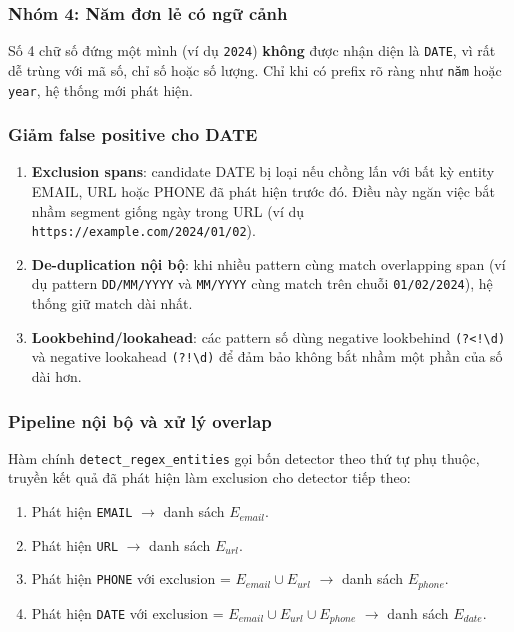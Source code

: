 \subsubsection*{Nhóm 4: Năm đơn lẻ có ngữ cảnh}

Số 4 chữ số đứng một mình (ví dụ \texttt{2024}) \textbf{không} được nhận diện
là \texttt{DATE}, vì rất dễ trùng với mã số, chỉ số hoặc số lượng. Chỉ khi có
prefix rõ ràng như \texttt{năm} hoặc \texttt{year}, hệ thống mới phát hiện.

\subsubsection*{Giảm false positive cho DATE}

\begin{enumerate}[nosep]
      \item \textbf{Exclusion spans}: candidate DATE bị loại nếu chồng lấn với
            bất kỳ entity EMAIL, URL hoặc PHONE đã phát hiện trước đó. Điều
            này ngăn việc bắt nhầm segment giống ngày trong URL
            (ví dụ \texttt{https://example.com/2024/01/02}).
      \item \textbf{De-duplication nội bộ}: khi nhiều pattern cùng match
            overlapping span (ví dụ pattern \texttt{DD/MM/YYYY} và
            \texttt{MM/YYYY} cùng match trên chuỗi \texttt{01/02/2024}), hệ
            thống giữ match dài nhất.
      \item \textbf{Lookbehind/lookahead}: các pattern số dùng negative lookbehind
            \verb|(?<!\d)| và negative lookahead \verb|(?!\d)| để đảm bảo
            không bắt nhầm một phần của số dài hơn.
\end{enumerate}

\subsubsection{Pipeline nội bộ và xử lý overlap}
\label{sec:regex_pipeline}

Hàm chính \texttt{detect\_regex\_entities} gọi bốn detector theo thứ tự phụ
thuộc, truyền kết quả đã phát hiện làm exclusion cho detector tiếp theo:

\begin{enumerate}[nosep]
      \item Phát hiện \texttt{EMAIL} $\rightarrow$ danh sách $E_{email}$.
      \item Phát hiện \texttt{URL} $\rightarrow$ danh sách $E_{url}$.
      \item Phát hiện \texttt{PHONE} với exclusion = $E_{email} \cup E_{url}$
            $\rightarrow$ danh sách $E_{phone}$.
      \item Phát hiện \texttt{DATE} với exclusion = $E_{email} \cup E_{url}
                  \cup E_{phone}$ $\rightarrow$ danh sách $E_{date}$.
\end{enumerate}

